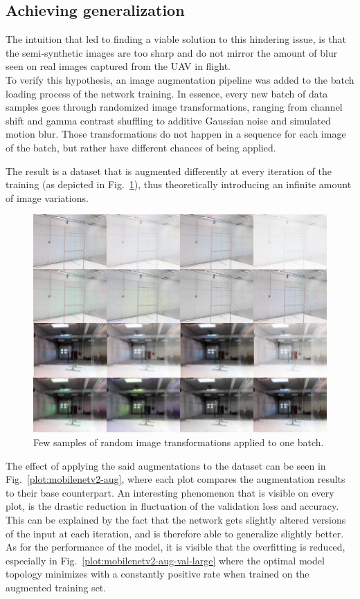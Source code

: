 \subsection{Achieving generalization}

The intuition that led to finding a viable solution to this hindering issue, is
that the semi-synthetic images are too sharp and do not mirror the amount of
blur seen on real images captured from the UAV in flight.\\

To verify this hypothesis, an image augmentation pipeline was added to the
batch loading process of the network training. In essence, every new batch of
data samples goes through randomized image transformations, ranging from
channel shift and gamma contrast shuffling to additive Gaussian noise and
simulated motion blur. Those transformations do not happen in a sequence for
each image of the batch, but rather have different chances of being applied.

The result is a dataset that is augmented differently at every iteration of the
training (as depicted in Fig.~\ref{fig:augmentation}), thus theoretically
introducing an infinite amount of image variations.

\begin{figure}[h]
    \centering
    \includegraphics[width=\textwidth]{figure/augmentation.jpg}
    \caption{Few samples of random image transformations applied to one batch.}
    \label{fig:augmentation}
\end{figure}

The effect of applying the said augmentations to the dataset can be seen in
Fig.~\ref{plot:mobilenetv2-aug}, where each plot compares the augmentation
results to their base counterpart. An interesting phenomenon that is visible on
every plot, is the drastic reduction in fluctuation of the validation loss and
accuracy. This can be explained by the fact that the network gets slightly
altered versions of the input at each iteration, and is therefore able to
generalize slightly better. As for the performance of the model, it is visible
that the overfitting is reduced, especially in
Fig.~\ref{plot:mobilenetv2-aug-val-large} where the optimal model topology
minimizes with a constantly positive rate when trained on the augmented
training set.\\


